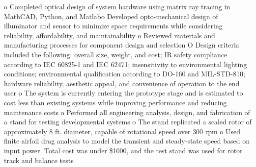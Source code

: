 \documentclass[a4paper]{article}
\begin{document}
\begin{itemize}
o Completed optical design of system hardware using matrix ray tracing in MathCAD, Python, and Matlabo Developed opto-mechanical design of illuminator and sensor to minimize space requirements while considering
reliability, affordability, and maintainability
o Reviewed materials and manufacturing processes for component design and selection
O Design criteria included the following: overall size, weight, and cost; IR safety compliance according to IEC 60825-1 and IEC 62471; insensitivity to environmental lighting conditions; environmental qualification according to DO-160 and MIL-STD-810; hardware reliability, aesthetic appeal, and convenience of operation to the end user
o The system is currently entering the prototype stage and is estimated to cost less than existing systems while improving performance and reducing maintenance costs
o Performed all engineering analysis, design, and fabrication of a stand for testing developmental systems
o The stand replicated a scaled rotor of approximately 8 ft. diameter, capable of rotational speed over 300 rpm
o Used finite airfoil drag analysis to model the transient and steady-state speed based
on input power. Total cost was under \$1000, and the test stand was used for rotor track and balance tests
    \end{itemize}
%
%

\end{document}
